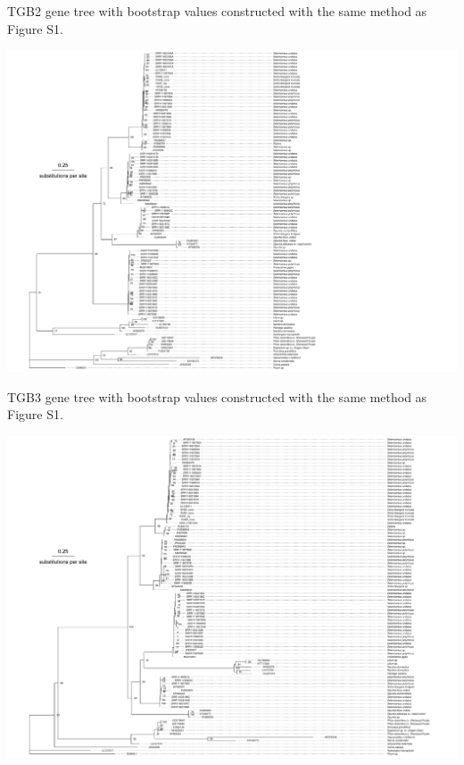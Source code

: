 \documentclass[11pt]{article}
\begin{document}
\begin{suppfigure}
\centering
\caption{
TGB2 gene tree with bootstrap values constructed with the same method as Figure S1.
}
\includegraphics[width=1.5\textwidth]{supplementaryinfo/tgb2_tr.pdf}
\label{fig:genetree3}
\end{suppfigure}
\clearpage

\begin{suppfigure}
\centering
\caption{
TGB3 gene tree with bootstrap values constructed with the same method as Figure S1.
}
\includegraphics[width=1.2\textwidth]{supplementaryinfo/tgb3_tr.pdf}
\label{fig:genetree4}
\end{suppfigure}
\clearpage
\end{document}
